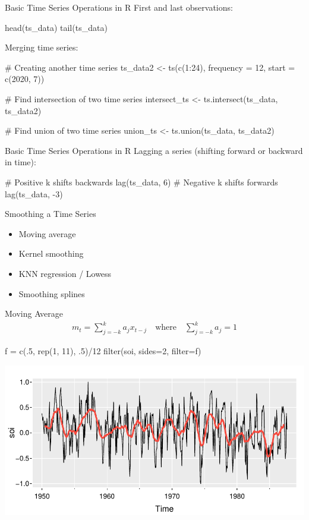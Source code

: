 \documentclass[ignorenonframetext,xcolor=x11names]{beamer}
\begin{document}
\begin{frame}[fragile]{Basic Time Series Operations in R}
First and last observations:
\begin{Rcode}
head(ts_data)
tail(ts_data)
\end{Rcode}
Merging time series:
\begin{Rcode}
# Creating another time series
ts_data2 <- ts(c(1:24), frequency = 12, start = c(2020, 7))

# Find intersection of two time series
intersect_ts <- ts.intersect(ts_data, ts_data2)

# Find union of two time series
union_ts <- ts.union(ts_data, ts_data2)
\end{Rcode}
\end{frame}

\begin{frame}[fragile]{Basic Time Series Operations in R}
Lagging a series (shifting forward or backward in time):
\begin{Rcode}
# Positive k shifts backwards
lag(ts_data, 6)
# Negative k shifts forwards
lag(ts_data, -3)
\end{Rcode}
\end{frame}

\begin{frame}{Smoothing a Time Series}
\begin{itemize}
   \item Moving average
   \item Kernel smoothing
   \item KNN regression / Lowess
   \item Smoothing splines
\end{itemize}
\end{frame}

\begin{frame}[fragile]{Moving Average}
\begin{align*}m_t = \sum_{j=-k}^k a_j x_{t-j} \quad \text{where} \quad
\sum_{j=-k}^k a_j = 1
\end{align*}
\begin{Rcode}
f = c(.5, rep(1, 11), .5)/12
filter(soi, sides=2, filter=f)
\end{Rcode}
\begin{center}
\includegraphics[width=.75\textwidth]{figure14.pdf}
\end{center}
\end{frame}
\end{document}
